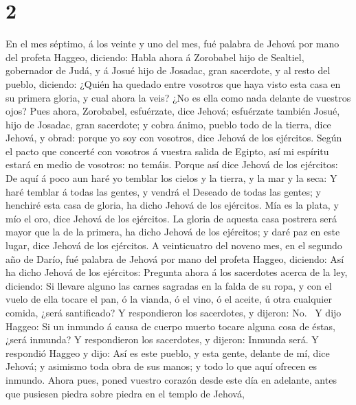 \hypertarget{section-1}{%
\section{2}\label{section-1}}

 En el mes séptimo, á los veinte y uno del mes, fué
palabra de Jehová por mano del profeta Haggeo, diciendo: 
Habla ahora á Zorobabel hijo de Sealtiel, gobernador de Judá, y á Josué
hijo de Josadac, gran sacerdote, y al resto del pueblo, diciendo:
 ¿Quién ha quedado entre vosotros que haya visto esta casa
en su primera gloria, y cual ahora la veis? ¿No es ella como nada
delante de vuestros ojos?  Pues ahora, Zorobabel,
esfuérzate, dice Jehová; esfuérzate también Josué, hijo de Josadac, gran
sacerdote; y cobra ánimo, pueblo todo de la tierra, dice Jehová, y
obrad: porque yo soy con vosotros, dice Jehová de los ejércitos.
 Según el pacto que concerté con vosotros á vuestra salida
de Egipto, así mi espíritu estará en medio de vosotros: no temáis.
 Porque así dice Jehová de los ejércitos: De aquí á poco
aun haré yo temblar los cielos y la tierra, y la mar y la seca:
 Y haré temblar á todas las gentes, y vendrá el Deseado de
todas las gentes; y henchiré esta casa de gloria, ha dicho Jehová de los
ejércitos.  Mía es la plata, y mío el oro, dice Jehová de
los ejércitos.  La gloria de aquesta casa postrera será
mayor que la de la primera, ha dicho Jehová de los ejércitos; y daré paz
en este lugar, dice Jehová de los ejércitos.  A
veinticuatro del noveno mes, en el segundo año de Darío, fué palabra de
Jehová por mano del profeta Haggeo, diciendo:  Así ha
dicho Jehová de los ejércitos: Pregunta ahora á los sacerdotes acerca de
la ley, diciendo:  Si llevare alguno las carnes sagradas
en la falda de su ropa, y con el vuelo de ella tocare el pan, ó la
vianda, ó el vino, ó el aceite, ú otra cualquier comida, ¿será
santificado? Y respondieron los sacerdotes, y dijeron:
No.~ Y dijo Haggeo: Si un inmundo á causa de cuerpo
muerto tocare alguna cosa de éstas, ¿será inmunda? Y respondieron los
sacerdotes, y dijeron: Inmunda será.  Y respondió Haggeo
y dijo: Así es este pueblo, y esta gente, delante de mí, dice Jehová; y
asimismo toda obra de sus manos; y todo lo que aquí ofrecen es inmundo.
 Ahora pues, poned vuestro corazón desde este día en
adelante, antes que pusiesen piedra sobre piedra en el templo de Jehová,
